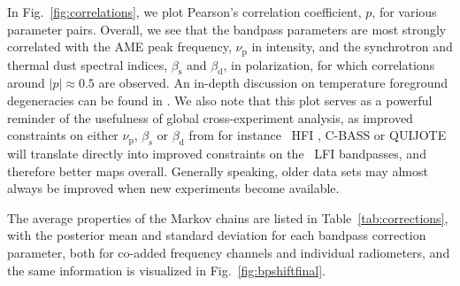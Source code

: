\documentclass[twocolumn]{aa}
\newcommand{\?}[1]{\textcolor{red}{{\bf [#1]}}}
\begin{document}
In Fig.~\ref{fig:correlations}, we plot Pearson's correlation
coefficient, $p$, for various parameter pairs. Overall, we see that
the bandpass parameters are most strongly correlated with the AME peak
frequency, $\nu_{\mathrm{p}}$ in intensity, and the synchrotron and
thermal dust spectral indices, $\beta_{\mathrm{s}}$ and
$\beta_{\mathrm{d}}$, in polarization, for which correlations around
$|p|\approx0.5$ are observed. An in-depth discussion on temperature
foreground degeneracies can be found in \citet{bp13}. We also note
that this plot serves as a powerful reminder of the usefulness of
global cross-experiment analysis, as improved constraints on either
$\nu_{\mathrm{p}}$, $\beta_{\mathrm{s}}$ or $\beta_{\mathrm{d}}$ from
for instance \Planck\ HFI \citep{planck2016-l03}, C-BASS
\citep{king2010} or QUIJOTE \citep{QUIJOTE_I_2015} will translate
directly into improved constraints on the \Planck\ LFI bandpasses, and
therefore better maps overall. Generally speaking, older data sets may
almost always be improved when new experiments become available.

The average properties of the Markov chains are listed in
Table~\ref{tab:corrections}, with the posterior mean and standard
deviation for each bandpass correction parameter, both for co-added
frequency channels and individual radiometers, and the same
information is visualized in Fig.~\ref{fig:bpshiftfinal}.
\end{document}
